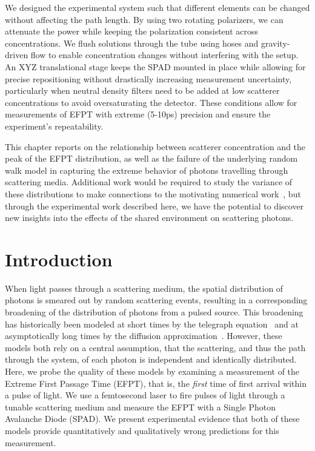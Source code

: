 We designed the experimental system such that different elements can be changed without affecting the path length. By using two rotating polarizers, we can attenuate the power while keeping the polarization consistent across concentrations. We flush solutions through the tube using hoses and gravity-driven flow to enable concentration changes without interfering with the setup. An XYZ translational stage keeps the SPAD mounted in place while allowing for precise repositioning without drastically increasing measurement uncertainty, particularly when neutral density filters need to be added at low scatterer concentrations to avoid oversaturating the detector. These conditions allow for measurements of EFPT with extreme (5-10ps) precision and ensure the experiment's repeatability.

This chapter reports on the relationship between scatterer concentration and the peak of the EFPT distribution, as well as the failure of the underlying random walk model in capturing the extreme behavior of photons travelling through scattering media. Additional work would be required to study the variance of these distributions to make connections to the motivating numerical work~\cite{hass_anomalous_2023,hass_extreme_2024,hass_first-passage_2024}, but through the experimental work described here, we have the potential to discover new insights into the effects of the shared environment on scattering photons.

\section{Introduction}
When light passes through a scattering medium, the spatial distribution of photons is smeared out by random scattering events, resulting in a corresponding broadening of the distribution of photons from a pulsed source. This broadening has historically been modeled at short times by the telegraph equation~\cite{goldstein_diffusion_1951,ishimaru_diffusion_1989,durian_photon_1997,lemieux_diffusing-light_1998} and at asymptotically long times by the diffusion approximation~\cite{haskell_boundary_1994,bohren_absorption_1983,ishimaru_wave_1997}.  However, these models both rely on a central assumption, that the scattering, and thus the path through the system, of each photon is independent and identically distributed.  Here, we probe the quality of these models by examining a measurement of the Extreme First Passage Time (EFPT), that is, the \textit{first} time of first arrival within a pulse of light.  We use a femtosecond laser to fire pulses of light through a tunable scattering medium and measure the EFPT with a Single Photon Avalanche Diode (SPAD).  We present experimental evidence that both of these models provide quantitatively and qualitatively wrong predictions for this measurement. 

